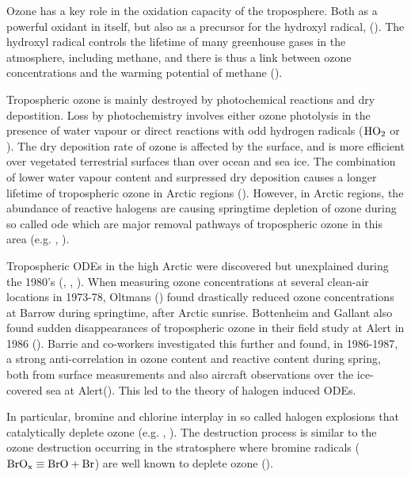 \medskip

Ozone has a key role in the oxidation capacity of the troposphere. Both as a powerful oxidant in itself, but also as a precursor for the hydroxyl radical,  (\cite{WangJacob1998}). The hydroxyl radical controls the lifetime of many greenhouse gases in the atmosphere, including methane, and there is thus a link between ozone concentrations and the warming potential of methane (\cite{Levy1971}). 

\medskip

Tropospheric ozone is mainly destroyed by photochemical reactions and dry depostition. Loss by photochemistry involves either ozone photolysis in the presence of water vapour or direct reactions with odd hydrogen radicals ($\mathrm{HO_2}$ or ). The dry deposition rate of ozone is affected by the surface, and is more efficient over vegetated terrestrial surfaces than over ocean and sea ice. The combination of lower water vapour content and surpressed dry deposition causes a longer lifetime of tropospheric ozone in Arctic regions (\cite{AMAP2015}). However, in Arctic regions, the abundance of reactive halogens are causing springtime depletion of ozone during so called \acrfull{ode}  which are major removal pathways of tropospheric ozone in this area (e.g. \cite{Simpson2015}, \cite{AMAP2015}).

\medskip

Tropospheric ODEs in the high Arctic were discovered but unexplained during the 1980's (\cite{Oltmans1981}, \cite{oltmans1986surface}, \cite{bottenheim1986measurements}). When measuring ozone concentrations at several clean-air locations in 1973-78, Oltmans (\cite{Oltmans1981}) found drastically reduced ozone concentrations at Barrow during springtime, after Arctic sunrise. Bottenheim and Gallant also found sudden disappearances of tropospheric ozone in their field study at Alert in 1986 (\cite{bottenheim1986measurements}). Barrie and co-workers investigated this further and found, in 1986-1987, a strong anti-correlation in ozone content and reactive  content during spring, both from surface measurements and also aircraft observations over the ice-covered sea at Alert(\cite{barrie}). This led to the theory of halogen induced ODEs. 

\medskip

In particular, bromine and chlorine interplay in so called halogen explosions that catalytically deplete ozone (e.g. \cite{CAO}, \cite{Simpson2015}). The destruction process is similar to the ozone destruction occurring in the stratosphere where bromine radicals ($\mathrm{BrO_x} \equiv \mathrm{BrO} + \mathrm{Br}$) are well known to deplete ozone (\cite{Parella}).   

